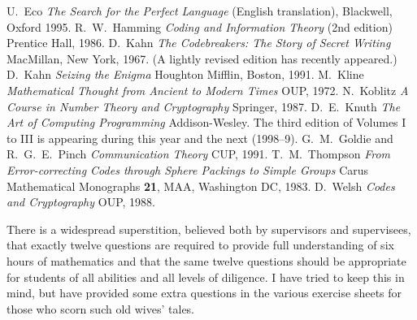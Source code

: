 \documentclass[12pt,a4paper]{article}
\theoremstyle{plain}
\theoremstyle{definition}
\begin{document}
    \begin{thebibliography}{99}
         U.~Eco \emph{The Search for the Perfect Language}
        (English translation), Blackwell, Oxford 1995.
         R.~W.~Hamming \emph{Coding and Information Theory}
        (2nd edition) Prentice Hall, 1986.
         D.~Kahn \emph{The Codebreakers:
        The Story of Secret Writing} MacMillan, New York, 1967.
        (A lightly revised edition has recently appeared.)
         D.~Kahn
        \emph{Seizing the Enigma} Houghton Mifflin, Boston, 1991.
         M.~Kline
        \emph{Mathematical Thought from Ancient to
        Modern Times} OUP, 1972.
         N.~Koblitz
        \emph{A Course in Number Theory and Cryptography}
        Springer, 1987.
         D.~E.~Knuth
        \emph{The Art of Computing Programming}
        Addison-Wesley. The third edition of
        Volumes I to III is appearing during
        this year and the next (1998--9).
         G.~M.~Goldie and R.~G.~E.~Pinch
        \emph{Communication Theory}
        CUP, 1991.
         T.~M.~Thompson
        \emph{From Error-correcting Codes through Sphere Packings
        to Simple Groups} Carus Mathematical Monographs {\bf 21},
        MAA, Washington DC, 1983.
         D.~Welsh \emph{Codes and Cryptography}
        OUP, 1988.
    \end{thebibliography}


    \newpage
    There is a widespread superstition, believed both by supervisors
    and supervisees, that exactly twelve questions are required
    to provide full understanding of six hours of mathematics
    and that the same twelve questions should be appropriate
    for students of all abilities and all levels of diligence. I have tried
    to keep this in mind, but have provided some extra questions
    in the various exercise sheets
    for those who scorn such old wives' tales.
\end{document}
